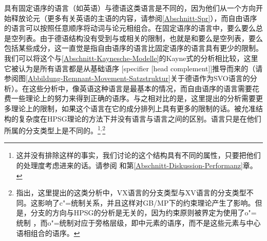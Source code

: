 具有固定语序的语言（如英语）与德语这类语言是不同的，因为他们从一个方向开始释放论元（更多有关英语的主语的内容，请参阅\ref{Abschnitt-Spr}），而自由语序的语言可以按照任意顺序将动词与论元相组合。在固定语序的语言中，要么要么总是空列表。由于德语结构没有受到与或相关的限制，也就是和要么是空列表，要么包括某些成分，这一直觉是指自由语序的语言比固定语序的语言具有更少的限制。我们可以将这个与\ref{Abschnitt-Kaynesche-Modelle}的Kayne式的分析相比较，这里它被认为是所有语言都是从基础语序 [specifier [head complement]]推导而来的（请参阅图\vref{Abbildung-Remnant-Movement-Satzstruktur}关于德语作为SVO语言的分析\citep{Laenzlinger2004a}）。在这些分析中，像英语这种语言是最基本的情况，而自由语序的语言需要花费一些理论上的努力来得到正确的语序。与之相对比的是，这里提出的分析需要更多理论上的限制，如果这个语言在它的成分排列上具有更多的限制的话。被允准结构的复杂度在HPSG理论的方法下并没有语言与语言之间的区别。语言只是在他们所属的分支类型上是不同的。\footnote{%
这并没有排除这样的事实，我们讨论的这个结构具有不同的属性，只要把他们的处理度考虑进来的话。请参阅 和第\ref{Abschnitt-Diskussion-Performanz}章。
}$^,$\footnote{%
 \citet[]{Haider97c}指出，这里提出的这类分析中，VX语言的分支类型与XV语言的分支类型不同。这影响了c"=统制关系，并且这样对GB/MP下的约束理论产生了影响。但是，分支的方向与HPSG的分析是无关的，因为约束原则被界定为使用了o"=统制
    \citep[\S~6]{ps2}，而o"=统制对应于旁格层级，即\subcatlc 中元素的语序，而不是这些元素与中心语相组合的语序。
}
